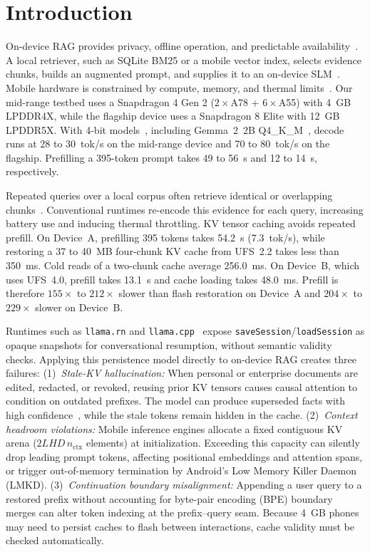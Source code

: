 \documentclass[10pt,conference]{IEEEtran}
\begin{document}
\section{Introduction}
\label{sec:intro}
On-device RAG provides privacy, offline operation, and predictable availability~\cite{lewis2020retrieval,wu2024mobilellm}. A local retriever, such as SQLite BM25 or a mobile vector index, selects evidence chunks, builds an augmented prompt, and supplies it to an on-device SLM~\cite{guu2020realm,liu2026percache}. Mobile hardware is constrained by compute, memory, and thermal limits~\cite{alizadeh2024llmflash,xue2024edgmoe,reddi2021mlperfmobile}. Our mid-range testbed uses a Snapdragon 4 Gen 2 ($2\times$A78 + $6\times$A55) with 4~GB LPDDR4X, while the flagship device uses a Snapdragon 8 Elite with 12~GB LPDDR5X. With 4-bit models~\cite{lin2024awq,frantar2022gptq}, including Gemma~2~2B Q4\_K\_M~\cite{gemma2024gemma2}, decode runs at 28 to 30~tok/s on the mid-range device and 70 to 80~tok/s on the flagship. Prefilling a 395-token prompt takes 49 to 56~s and 12 to 14~s, respectively.

Repeated queries over a local corpus often retrieve identical or overlapping chunks~\cite{lu2024turborag,liu2026percache}. Conventional runtimes re-encode this evidence for each query, increasing battery use and inducing thermal throttling. KV tensor caching avoids repeated prefill. On Device~A, prefilling 395 tokens takes 54.2~s (7.3~tok/s), while restoring a 37 to 40~MB four-chunk KV cache from UFS~2.2 takes less than 350~ms. Cold reads of a two-chunk cache average 256.0~ms. On Device~B, which uses UFS~4.0, prefill takes 13.1~s and cache loading takes 48.0~ms. Prefill is therefore $155\times$ to $212\times$ slower than flash restoration on Device~A and $204\times$ to $229\times$ slower on Device~B.

Runtimes such as \texttt{llama.rn} and \texttt{llama.cpp}~\cite{gerganov2023llamacpp} expose \texttt{saveSession}/\allowbreak\texttt{loadSession} as opaque snapshots for conversational resumption, without semantic validity checks. Applying this persistence model directly to on-device RAG creates three failures:
(1)~\emph{Stale-KV hallucination:} When personal or enterprise documents are edited, redacted, or revoked, reusing prior KV tensors causes causal attention to condition on outdated prefixes. The model can produce superseded facts with high confidence~\cite{ji2023hallucination}, while the stale tokens remain hidden in the cache.
(2)~\emph{Context headroom violations:} Mobile inference engines allocate a fixed contiguous KV arena ($2LHD\,n_{\text{ctx}}$ elements) at initialization. Exceeding this capacity can silently drop leading prompt tokens, affecting positional embeddings and attention spans, or trigger out-of-memory termination by Android's Low Memory Killer Daemon (LMKD).
(3)~\emph{Continuation boundary misalignment:} Appending a user query to a restored prefix without accounting for byte-pair encoding (BPE) boundary merges can alter token indexing at the prefix--query seam. Because 4~GB phones may need to persist caches to flash between interactions, cache validity must be checked automatically.
\end{document}
